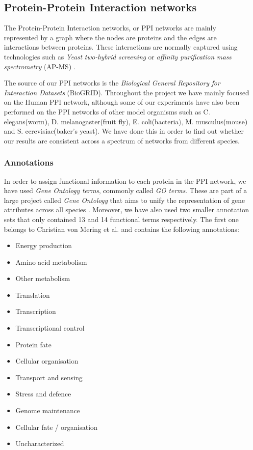 \subsection{Protein-Protein Interaction networks}
\label{sec:ppi_bck}

The Protein-Protein Interaction networks, or PPI networks are mainly represented by a graph where the nodes are proteins and the edges are interactions between proteins. These interactions are normally captured using technologies such as \emph{Yeast two-hybrid screening} \cite{young1998yeast} or \emph{affinity purification mass spectrometry} (AP-MS) \cite{brettner2012protein,wodak2013protein}.

The source of our PPI networks is the \emph{Biological General Repository for Interaction Datasets} (BioGRID). Throughout the project we have mainly focused on the Human PPI network, although some of our experiments have also been performed on the PPI networks of other model organisms such as C. elegans(worm), D. melanogaster(fruit fly), E. coli(bacteria), M. musculus(mouse) and S. cerevisiae(baker's yeast). We have done this in order to find out whether our results are consistent across a spectrum of networks from different species.

\subsubsection{Annotations}
\label{ppi_annotations}

In order to assign functional information to each protein in the PPI network, we have used \emph{Gene Ontology terms}, commonly called \emph{GO terms}. These are part of a large project called \emph{Gene Ontology} that aims to unify the representation of gene attributes across all species \cite{gene2008gene}. Moreover, we have also used two smaller annotation sets that only contained 13 and 14 functional terms respectively. The first one belongs to Christian von Mering et al. \cite{von2002comparative} and contains the following annotations:
\begin{multicols}{2}
\begin{itemize}
  \item Energy production
  \item Amino acid metabolism
  \item Other metabolism
  \item Translation
  \item Transcription
  \item Transcriptional control
  \item Protein fate
  \item Cellular organisation
  \item Transport and sensing
  \item Stress and defence
  \item Genome maintenance
  \item Cellular fate / organisation
  \item Uncharacterized
\end{itemize}
\end{multicols}

